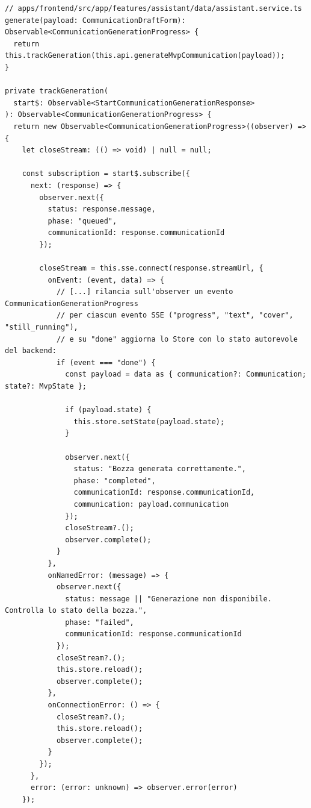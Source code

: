 \documentclass[a4paper,12pt]{article}
\begin{document}
\begin{sloppypar}
\begin{lstlisting}[style=tslisting, caption={AssistantService: Facade su client HTTP generato, SseClient e MvpStateStore dietro generate()}]
// apps/frontend/src/app/features/assistant/data/assistant.service.ts
generate(payload: CommunicationDraftForm): Observable<CommunicationGenerationProgress> {
  return this.trackGeneration(this.api.generateMvpCommunication(payload));
}

private trackGeneration(
  start$: Observable<StartCommunicationGenerationResponse>
): Observable<CommunicationGenerationProgress> {
  return new Observable<CommunicationGenerationProgress>((observer) => {
    let closeStream: (() => void) | null = null;

    const subscription = start$.subscribe({
      next: (response) => {
        observer.next({
          status: response.message,
          phase: "queued",
          communicationId: response.communicationId
        });

        closeStream = this.sse.connect(response.streamUrl, {
          onEvent: (event, data) => {
            // [...] rilancia sull'observer un evento CommunicationGenerationProgress
            // per ciascun evento SSE ("progress", "text", "cover", "still_running"),
            // e su "done" aggiorna lo Store con lo stato autorevole del backend:
            if (event === "done") {
              const payload = data as { communication?: Communication; state?: MvpState };

              if (payload.state) {
                this.store.setState(payload.state);
              }

              observer.next({
                status: "Bozza generata correttamente.",
                phase: "completed",
                communicationId: response.communicationId,
                communication: payload.communication
              });
              closeStream?.();
              observer.complete();
            }
          },
          onNamedError: (message) => {
            observer.next({
              status: message || "Generazione non disponibile. Controlla lo stato della bozza.",
              phase: "failed",
              communicationId: response.communicationId
            });
            closeStream?.();
            this.store.reload();
            observer.complete();
          },
          onConnectionError: () => {
            closeStream?.();
            this.store.reload();
            observer.complete();
          }
        });
      },
      error: (error: unknown) => observer.error(error)
    });


\end{lstlisting}
\end{sloppypar}
\end{document}
